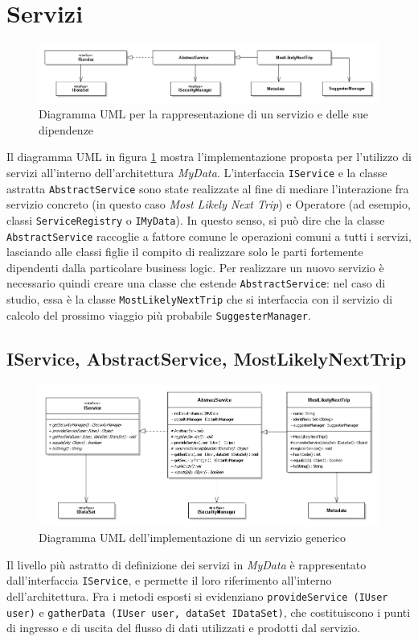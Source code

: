 \section{Servizi}
\label{sec:P-Service}
\begin{figure} [h]
	\includegraphics[width=\linewidth]{pictures/Services-closed.png}
	\caption{Diagramma UML per la rappresentazione di un servizio e delle sue dipendenze}
	\label{fig:Services-closed}
\end{figure}
Il diagramma UML in figura \ref{fig:Services-closed} mostra l’implementazione proposta per l’utilizzo di servizi all’interno dell’architettura \textit{MyData}. L’interfaccia \texttt{IService} e la classe astratta \texttt{AbstractService} sono state realizzate al fine di mediare l’interazione fra servizio concreto (in questo caso \textit{Most Likely Next Trip}) e Operatore (ad esempio, classi \texttt{ServiceRegistry} o \texttt{IMyData}). In questo senso, si pu\`o dire che la classe \texttt{AbstractService} raccoglie a fattore comune le operazioni comuni a tutti i servizi, lasciando alle classi figlie il compito di realizzare solo le parti fortemente dipendenti dalla particolare business logic. Per realizzare un nuovo servizio \`e necessario quindi creare una classe che estende \texttt{AbstractService}: nel caso di studio, essa \`e la classe \texttt{MostLikelyNextTrip} che si interfaccia con il servizio di calcolo del prossimo viaggio pi\`u probabile \cite{MLNT} \texttt{SuggesterManager}.

\subsection{IService, AbstractService, MostLikelyNextTrip}
\begin{figure} [h]
	\includegraphics[width=\linewidth]{pictures/Services-open.png}
	\caption{Diagramma UML dell'implementazione di un servizio generico}
	\label{fig:Services-open}
\end{figure}
Il livello pi\`u astratto di definizione dei servizi in \textit{MyData} \`e rappresentato dall’interfaccia \texttt{IService}, e permette il loro riferimento all’interno dell’architettura. Fra i metodi esposti si evidenziano \texttt{provideService (IUser user)} e \texttt{gatherData (IUser user, dataSet IDataSet)}, che costituiscono i punti di ingresso e di uscita del flusso di dati utilizzati e prodotti dal servizio.

